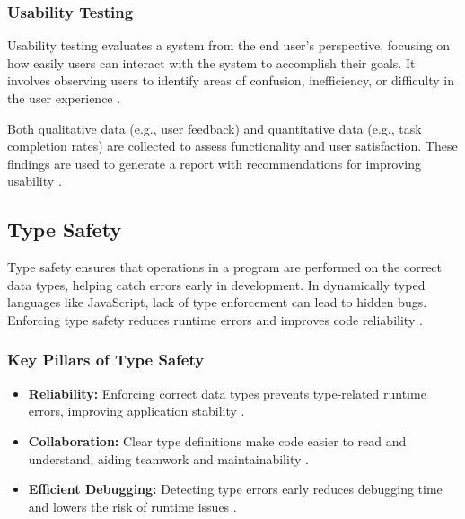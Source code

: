 \subsubsection*{Usability Testing}
\label{subsec:usability-testing}

Usability testing evaluates a system from the end user’s perspective, focusing on how easily users can interact with the system to accomplish their goals. It involves observing users to identify areas of confusion, inefficiency, or difficulty in the user experience \cite{geeksforgeeks:user-test}.

Both qualitative data (e.g., user feedback) and quantitative data (e.g., task completion rates) are collected to assess functionality and user satisfaction. These findings are used to generate a report with recommendations for improving usability \cite{geeksforgeeks:user-test}.

\subsection{Type Safety}
\label{subsec:type-safety}

Type safety ensures that operations in a program are performed on the correct data types, helping catch errors early in development. In dynamically typed languages like JavaScript, lack of type enforcement can lead to hidden bugs. Enforcing type safety reduces runtime errors and improves code reliability \cite{dev:type-safety}.

\subsubsection*{Key Pillars of Type Safety}
\label{subsubsec:type-safety-pillars}

\begin{itemize}
\item \textbf{Reliability:} Enforcing correct data types prevents type-related runtime errors, improving application stability \cite{dev:type-safety}.

\item \textbf{Collaboration:} Clear type definitions make code easier to read and understand, aiding teamwork and maintainability \cite{dev:type-safety}.

\item \textbf{Efficient Debugging:} Detecting type errors early reduces debugging time and lowers the risk of runtime issues \cite{dev:type-safety}.
\end{itemize}

